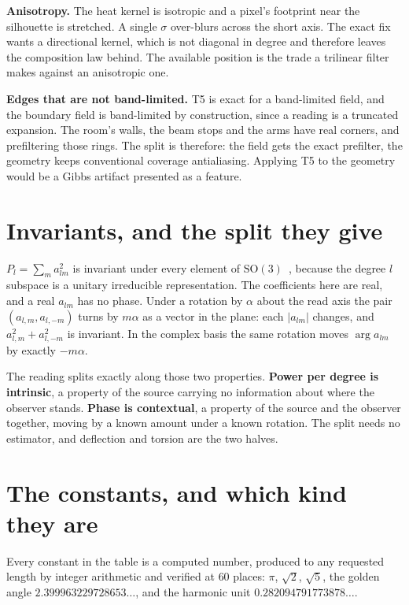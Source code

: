 \textbf{Anisotropy.} The heat kernel is isotropic and a pixel's footprint near the silhouette is stretched. A single \(\sigma\) over-blurs across the short axis. The exact fix wants a directional kernel, which is not diagonal in degree and therefore leaves the composition law behind. The available position is the trade a trilinear filter makes against an anisotropic one.

\textbf{Edges that are not band-limited.} T5 is exact for a band-limited field, and the boundary field is band-limited by construction, since a reading is a truncated expansion. The room's walls, the beam stops and the arms have real corners, and prefiltering those rings. The split is therefore: the field gets the exact prefilter, the geometry keeps conventional coverage antialiasing. Applying T5 to the geometry would be a Gibbs artifact presented as a feature.

\section{Invariants, and the split they give}

\(P_l = \sum_m a_{lm}^2\) is invariant under every element of \(\mathrm{SO}(3)\)~\cite{src:Kazhdan-Funkhouser-and-Rusinkiewicz-2003}, because the degree \(l\) subspace is a unitary irreducible representation. The coefficients here are real, and a real \(a_{lm}\) has no phase. Under a rotation by \(\alpha\) about the read axis the pair \((a_{l,m}, a_{l,-m})\) turns by \(m\alpha\) as a vector in the plane: each \(|a_{lm}|\) changes, and \(a_{l,m}^2 + a_{l,-m}^2\) is invariant. In the complex basis the same rotation moves \(\arg a_{lm}\) by exactly \(-m\alpha\).

The reading splits exactly along those two properties. \textbf{Power per degree is intrinsic}, a property of the source carrying no information about where the observer stands. \textbf{Phase is contextual}, a property of the source and the observer together, moving by a known amount under a known rotation. The split needs no estimator, and deflection and torsion are the two halves.

\section{The constants, and which kind they are}

Every constant in the table is a computed number, produced to any requested length by integer arithmetic and verified at \(60\) places: \(\pi\), \(\sqrt{2}\), \(\sqrt{5}\), the golden angle \(2.399963229728653\ldots\), and the harmonic unit \(0.282094791773878\ldots\).

